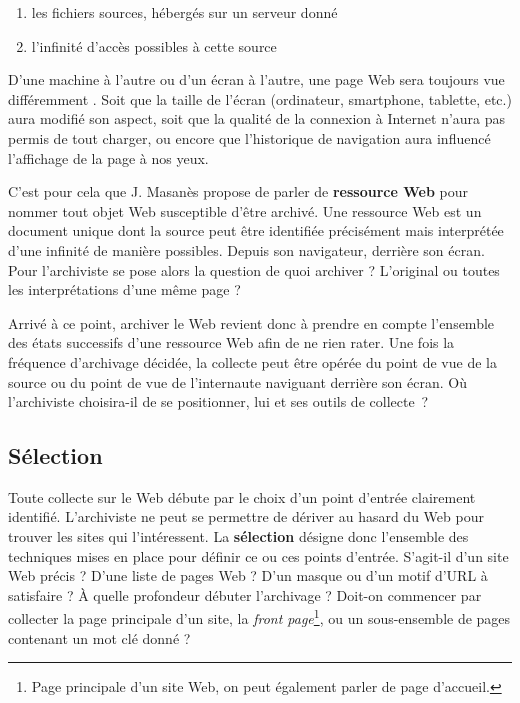 \documentclass[symmetric,justified,marginals=raggedouter]{tufte-book}
\begin{document}
\begin{enumerate}[leftmargin=*]  
\item les fichiers sources, hébergés sur un serveur donné 
\item l'infinité d'accès possibles à cette source
\end{enumerate}

\noindent D'une machine à l'autre ou d'un écran à l'autre, une page Web sera toujours vue différemment \citep{bon_apres_2014}. Soit que la taille de l'écran (ordinateur, smartphone, tablette, etc.) aura modifié son aspect, soit que la qualité de la connexion à Internet n'aura pas permis de tout charger, ou encore que l'historique de navigation aura influencé l'affichage de la page à nos yeux. 

C'est pour cela que J. Masanès propose de parler de \textbf{ressource Web} \citep[p.48]{masanes_web_2006} pour nommer tout objet Web susceptible d'être archivé. Une ressource Web est un document unique dont la source peut être identifiée précisément mais interprétée d'une infinité de ma\-nière possibles. Depuis son navigateur, derrière son écran. Pour l'archiviste se pose alors la question de quoi archiver ? L'original ou toutes les interprétations d'une même page ? 

Arrivé à ce point, archiver le Web revient donc à prendre en compte l'ensemble des états successifs d'une ressource Web afin de ne rien rater. Une fois la fréquence d'archivage décidée, la collecte peut être opérée du point de vue de la source ou du point de vue de l'internaute naviguant derrière son écran. Où l'archiviste choisira-il de se positionner, lui et ses outils de collecte~?

\subsection{Sélection}

\noindent Toute collecte sur le Web débute par le choix d'un point d'entrée clairement identifié. L'archiviste ne peut se permettre de dériver au hasard du Web pour trouver les sites qui l'intéressent. La \textbf{sélection} désigne donc l'ensemble des techniques mises en place pour définir ce ou ces points d'entrée. S'agit-il d'un site Web précis ? D'une liste de pages Web ? D'un masque ou d'un motif d'URL à satisfaire ? À quelle profondeur débuter l'archivage ? Doit-on commencer par collecter la page principale d'un site, la \textit{front page}\footnote{\RaggedOuter Page principale d'un site Web, on peut également parler de page d'accueil.}, ou un sous-ensemble de pages contenant un mot clé donné ?     
\end{document}
